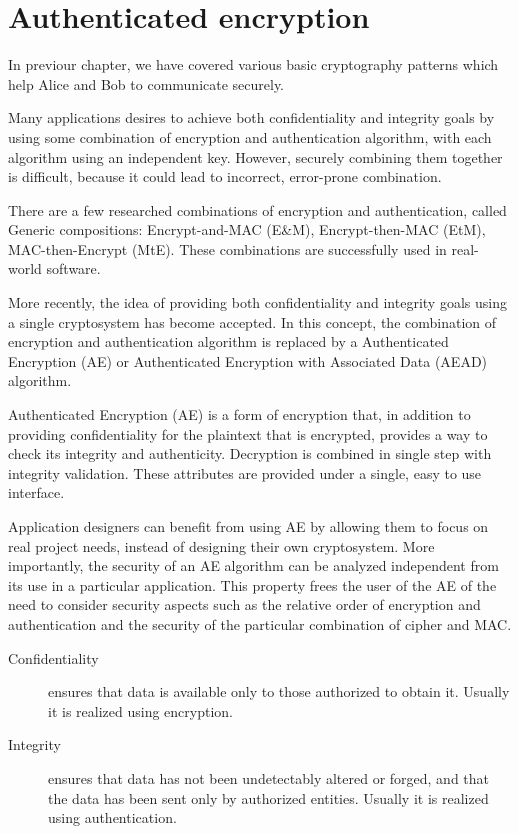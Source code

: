 \section{Authenticated encryption}

In previour chapter, we have covered various basic cryptography patterns which help Alice and Bob to communicate securely.

Many applications desires to achieve both confidentiality and integrity goals by using some combination of encryption and authentication algorithm, with each algorithm using an independent key. However, securely combining them together is difficult, because it could lead to incorrect, error-prone combination.

There are a few researched combinations of encryption and authentication, called Generic compositions: Encrypt-and-MAC (E\&M), Encrypt-then-MAC (EtM), MAC-then-Encrypt (MtE). These combinations are successfully used in real-world software.

More recently, the idea of providing both confidentiality and integrity goals using a single cryptosystem has become accepted. In this concept, the combination of encryption and authentication algorithm is replaced by a Authenticated Encryption (AE) or Authenticated Encryption with Associated Data (AEAD) algorithm.

Authenticated Encryption (AE) is a form of encryption that, in addition to providing confidentiality for the plaintext that is encrypted, provides a way to check its integrity and authenticity. Decryption is combined in single step with integrity validation. These attributes are provided under a single, easy to use interface.

Application designers can benefit from using AE by allowing them to focus on real project needs, instead of designing their own cryptosystem. More importantly, the security of an AE algorithm can be analyzed independent from its use in a particular application. This property frees the user of the AE of the need to consider security aspects such as the relative order of encryption and authentication and the security of the particular combination of cipher and MAC.

\begin{description}
  \item[Confidentiality] ensures that data is available only to those authorized to obtain it. Usually it is realized using encryption.
  \item[Integrity] ensures that data has not been undetectably altered or forged, and that the data has been sent only by authorized entities. Usually it is realized using authentication.
\end{description}


